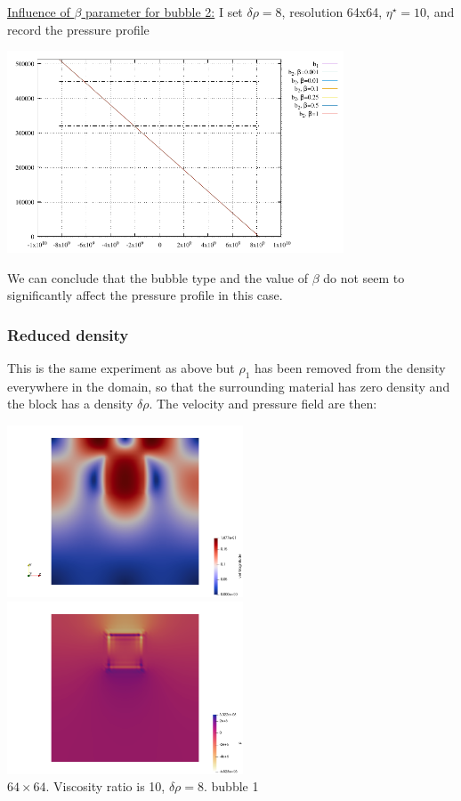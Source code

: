\underline{Influence of $\beta$ parameter for bubble 2:} I set $\delta\rho=8$, resolution 64x64, $\eta^\star=10$,
and record the pressure profile 

\begin{center}
\includegraphics[width=10cm]{python_codes/fieldstone_72/results/block/full/betastudy/plines}
\end{center}

We can conclude that the bubble type and the value of $\beta$ do not seem to significantly affect 
the pressure profile in this case.

\subsubsection*{Reduced density} 
This is the same experiment as above but $\rho_1$ has been removed from the density
everywhere in the domain, so that the surrounding material has zero density 
and the block has a density $\delta \rho$.
The velocity and pressure field are then:

\begin{center}
\includegraphics[width=7cm]{python_codes/fieldstone_72/results/block/reduced/vel}
\includegraphics[width=7cm]{python_codes/fieldstone_72/results/block/reduced/p}\\
{\captionfont $64\times 64$. Viscosity ratio is 10, $\delta \rho=8$. bubble 1}
\end{center}

